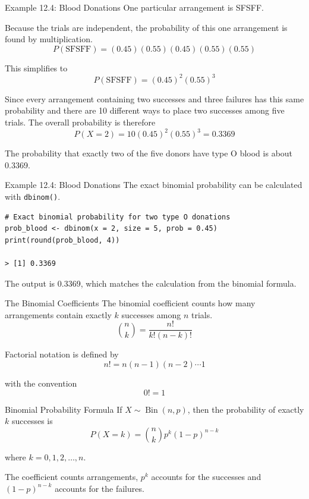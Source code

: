 \documentclass[aspectratio=169]{beamer}
\begin{document}
\begin{frame}{Example 12.4: Blood Donations}
One particular arrangement is SFSFF.

\vspace{0.15cm}
Because the trials are independent, the probability of this one arrangement is found by multiplication.
$$P(\text{SFSFF})=(0.45)(0.55)(0.45)(0.55)(0.55)$$

This simplifies to
$$P(\text{SFSFF})=(0.45)^2(0.55)^3$$

Since every arrangement containing two successes and three failures has this same probability and there are 10 different ways to place two successes among five trials. The overall probability is therefore
$$P(X=2)=10(0.45)^2(0.55)^3 = 0.3369$$

The probability that exactly two of the five donors have type O blood is about 0.3369.
\end{frame}

\begin{frame}[fragile]{Example 12.4: Blood Donations}
The exact binomial probability can be calculated with \texttt{dbinom()}.

\begin{verbatim}
# Exact binomial probability for two type O donations
prob_blood <- dbinom(x = 2, size = 5, prob = 0.45)
print(round(prob_blood, 4))

> [1] 0.3369
\end{verbatim}

The output is 0.3369, which matches the calculation from the binomial formula.
\end{frame}

\begin{frame}{The Binomial Coefficients}
The binomial coefficient counts how many arrangements contain exactly $k$ successes among $n$ trials.
$$\binom{n}{k}=\frac{n!}{k!(n-k)!}$$

Factorial notation is defined by
$$n!=n(n-1)(n-2)\cdots 1$$

with the convention
$$0!=1$$
\end{frame}

\begin{frame}{Binomial Probability Formula}
If $X \sim \operatorname{Bin}(n,p)$, then the probability of exactly $k$ successes is
$$P(X=k)=\binom{n}{k}p^k(1-p)^{n-k}$$

where $k=0,1,2,\ldots,n$.

\vspace{0.2cm}
The coefficient counts arrangements, $p^k$ accounts for the successes and $(1-p)^{n-k}$ accounts for the failures.
\end{frame}
\end{document}
